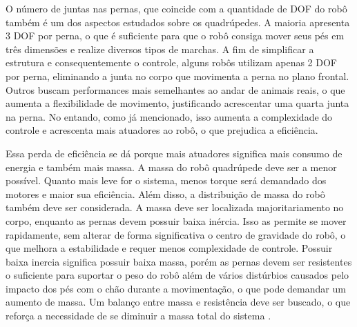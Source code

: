 \documentclass[../main.tex]{subfiles}
\begin{document}
  O número de juntas nas pernas, que coincide com a quantidade de DOF do robô também é um dos aspectos estudados sobre os quadrúpedes. A maioria apresenta 3 DOF por perna, o que é suficiente para que o robô consiga mover seus pés em três dimensões e realize diversos tipos de marchas. A fim de simplificar a estrutura e consequentemente o controle, alguns robôs utilizam apenas 2 DOF por perna, eliminando a junta no corpo que movimenta a perna no plano frontal. Outros buscam performances mais semelhantes ao andar de animais reais, o que aumenta a flexibilidade de movimento, justificando acrescentar uma quarta junta na perna. No entando, como já mencionado, isso aumenta a complexidade do controle e acrescenta mais atuadores ao robô, o que prejudica a eficiência.

  Essa perda de eficiência se dá porque mais atuadores significa mais consumo de energia e também mais massa. A massa do robô quadrúpede deve ser a menor possível. Quanto mais leve for o sistema, menos torque será demandado dos motores e maior sua eficiência. Além disso, a distribuição de massa do robô também deve ser considerada. A massa deve ser localizada majoritariamento no corpo, enquanto as pernas devem possuir baixa inércia. Isso as permite se mover rapidamente, sem alterar de forma significativa o centro de gravidade do robô, o que melhora a estabilidade e requer menos complexidade de controle. Possuir baixa inercia significa possuir baixa massa, porém as pernas devem ser resistentes o suficiente para suportar o peso do robô além de vários distúrbios causados pelo impacto dos pés com o chão durante a movimentação, o que pode demandar um aumento de massa. Um balanço entre massa e resistência deve ser buscado, o que reforça a necessidade de se diminuir a massa total do sistema \cite{Zhong2019}.
\end{document}
